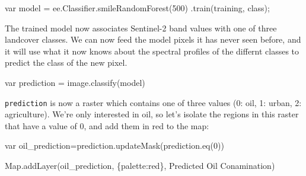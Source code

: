 \documentclass[
  letterpaper,
  DIV=11,
  numbers=noendperiod]{scrreprt}
\newenvironment{Shaded}{\begin{snugshade}}{\end{snugshade}}
\newcommand{\AttributeTok}[1]{\textcolor[rgb]{0.40,0.45,0.13}{#1}}
\newcommand{\BuiltInTok}[1]{\textcolor[rgb]{0.00,0.23,0.31}{#1}}
\newcommand{\DataTypeTok}[1]{\textcolor[rgb]{0.68,0.00,0.00}{#1}}
\newcommand{\DecValTok}[1]{\textcolor[rgb]{0.68,0.00,0.00}{#1}}
\newcommand{\FunctionTok}[1]{\textcolor[rgb]{0.28,0.35,0.67}{#1}}
\newcommand{\KeywordTok}[1]{\textcolor[rgb]{0.00,0.23,0.31}{#1}}
\newcommand{\NormalTok}[1]{\textcolor[rgb]{0.00,0.23,0.31}{#1}}
\newcommand{\OperatorTok}[1]{\textcolor[rgb]{0.37,0.37,0.37}{#1}}
\newcommand{\StringTok}[1]{\textcolor[rgb]{0.13,0.47,0.30}{#1}}
\begin{document}
\begin{Shaded}
\begin{Highlighting}[]
\KeywordTok{var}\NormalTok{ model }\OperatorTok{=}\NormalTok{ ee}\OperatorTok{.}\AttributeTok{Classifier}\OperatorTok{.}\FunctionTok{smileRandomForest}\NormalTok{(}\DecValTok{500}\NormalTok{)}
                          \OperatorTok{.}\FunctionTok{train}\NormalTok{(training}\OperatorTok{,} \StringTok{\textquotesingle{}class\textquotesingle{}}\NormalTok{)}\OperatorTok{;}
\end{Highlighting}
\end{Shaded}

The trained model now associates Sentinel-2 band values with one of
three landcover classes. We can now feed the model pixels it has never
seen before, and it will use what it now knows about the spectral
profiles of the differnt classes to predict the class of the new pixel.

\begin{Shaded}
\begin{Highlighting}[]
\KeywordTok{var}\NormalTok{ prediction }\OperatorTok{=}\NormalTok{ image}\OperatorTok{.}\FunctionTok{classify}\NormalTok{(model)}
\end{Highlighting}
\end{Shaded}

\texttt{prediction} is now a raster which contains one of three values
(0: oil, 1: urban, 2: agriculture). We're only interested in oil, so
let's isolate the regions in this raster that have a value of 0, and add
them in red to the map:

\begin{Shaded}
\begin{Highlighting}[]
\KeywordTok{var}\NormalTok{ oil\_prediction}\OperatorTok{=}\NormalTok{prediction}\OperatorTok{.}\FunctionTok{updateMask}\NormalTok{(prediction}\OperatorTok{.}\FunctionTok{eq}\NormalTok{(}\DecValTok{0}\NormalTok{))}

\BuiltInTok{Map}\OperatorTok{.}\FunctionTok{addLayer}\NormalTok{(oil\_prediction}\OperatorTok{,}\NormalTok{ \{}\DataTypeTok{palette}\OperatorTok{:}\StringTok{\textquotesingle{}red\textquotesingle{}}\NormalTok{\}}\OperatorTok{,} \StringTok{\textquotesingle{}Predicted Oil Conamination\textquotesingle{}}\NormalTok{)}
\end{Highlighting}
\end{Shaded}
\end{document}

